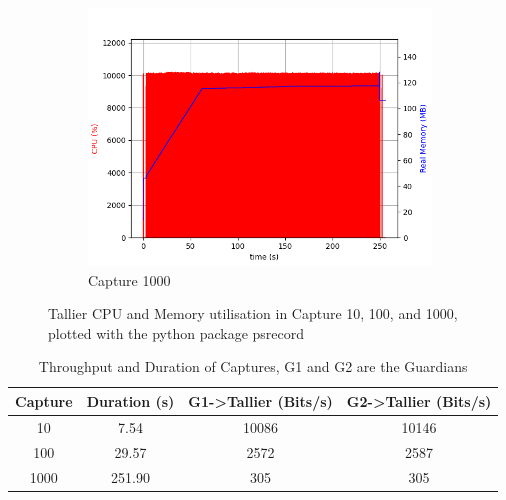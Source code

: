 \begin{figure}[ht!]
\begin{subfigure}[b]{\textwidth}
        \includegraphics[width=\textwidth]{abbildungen/1000.png}
        \caption{Capture 1000}
        \label{fig:cpu-1000}
    \end{subfigure}
    \caption{Tallier CPU and Memory utilisation in Capture 10, 100, and 1000, plotted with the python package psrecord}
    \label{fig:cpu}
\end{figure}
\begin{table}[ht!]
    \centering
    \begin{tabular}{|c|c|c|c|}
        \hline
        \textbf{Capture} & \textbf{Duration (s)} & \textbf{G1->Tallier (Bits/s)} & \textbf{G2->Tallier (Bits/s)} \\
        \hline
        10 & 7.54 & 10086 & 10146 \\
        \hline
        100 & 29.57 & 2572 & 2587 \\
        \hline
        1000 & 251.90 & 305 & 305 \\
        \hline
    \end{tabular}
    \caption{Throughput and Duration of Captures, G1 and G2 are the Guardians}
    \label{tab:throughput_duration}
\end{table}
